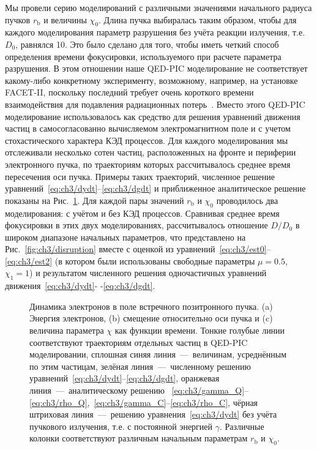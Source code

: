 Мы провели серию моделирований с различными значениями начального радиуса пучков $r_\mathrm{b}$ и величины $\chi_0$.
Длина пучка выбиралась таким образом, чтобы для каждого моделирования параметр разрушения без учёта реакции излучения, т.е. $D_0$, равнялся 10.
Это было сделано для того, чтобы иметь четкий способ определения времени фокусировки, используемого при расчете параметра разрушения.
В этом отношении наше QED-PIC моделирование не соответствует какому-либо конкретному эксперименту, возможному, например, на установке FACET-II, поскольку последний требует очень короткого времени взаимодействия для подавления радиационных потерь~\cite{yakimenko2019prospect}.
Вместо этого QED-PIC моделирование использовалось как средство для решения уравнений движения частиц в самосогласованно вычисляемом электромагнитном поле и с учетом стохастического характера КЭД процессов.
Для каждого моделирования мы отслеживали несколько сотен частиц, расположенных на фронте и периферии электронного пучка, по траекториям которых рассчитывалось среднее время пересечения оси пучка.
Примеры таких траекторий, численное решение уравнений~\eqref{eq:ch3/dydt}--\eqref{eq:ch3/dgdt} и приближенное аналитическое решение показаны на Рис.~\ref{fig:ch3/tracks}.
Для каждой пары значений $r_\mathrm{b}$ и $\chi_0$ проводилось два моделирования: с учётом и без КЭД процессов.
Сравнивая среднее время фокусировки в этих двух моделированиях, рассчитывалось отношение $D/D_0$ в широком диапазоне начальных параметров, что представлено на Рис.~\ref{fig:ch3/disruption} вместе с оценкой из уравнений~\eqref{eq:ch3/est0}-- \eqref{eq:ch3/est2} (в котором были использованы свободные параметры $\mu=0.5$, $\chi_1=1$) и результатом численного решения одночастичных уравнений движения~\eqref{eq:ch3/dydt}- -\eqref{eq:ch3/dgdt}.

\begin{figure}[ht]
    \caption[Динамика электронов в поле встречного позитронного пучка]{\label{fig:ch3/tracks} 
    Динамика электронов в поле встречного позитронного пучка. (a) Энергия электронов, (b) смещение относительно оси пучка и (c) величина параметра $\chi$ как функции времени.
    Тонкие голубые линии соответствуют траекториям отдельных частиц в QED-PIC моделировании, сплошная синяя линия~---~величинам, усреднённым по этим частицам, зелёная линия~---~численному решению уравнений~\eqref{eq:ch3/dydt}--\eqref{eq:ch3/dgdt}, оранжевая линия~---~аналитическому решению ~\eqref{eq:ch3/gamma_Q}--\eqref{eq:ch3/rho_Q},~\eqref{eq:ch3/gamma_C}--\eqref{eq:ch3/rho_C}, чёрная штриховая линия~---~решению уравнения~\eqref{eq:ch3/dydt} без учёта пучкового излучения, т.е. с постоянной энергией $\gamma$.
    Различные колонки соответствуют различным начальным параметрам $r_\mathrm{b}$ и $\chi_0$.}
\end{figure}

